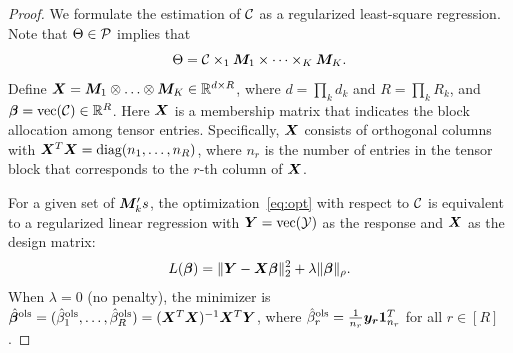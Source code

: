 \documentclass{article}
\begin{document}
\begin{appendices}
\begin{proof}
We formulate the estimation of $\mathcal{C}$ as a regularized least-square regression. Note that $\Theta\in\mathcal{P}$ implies that
\[
\Theta=\mathcal{C}\times_1\bm M_1\times \cdots \times_K \bm M_K.
\]
Define $\bm X=\bm M_1\otimes \ldots \otimes \bm M_K\in \mathbb{R}^{d\times R}$, where $d=\prod_k d_k$ and $R=\prod_k R_k$, and ${\bm \beta}=\text{vec}(\mathcal{C})\in\mathbb{R}^R$. Here $\bm X$ is a membership matrix that indicates the block allocation among tensor entries. Specifically, $\bm X$ consists of orthogonal columns with $\bm X^T\bm X=\text{diag}(n_1,\ldots,n_R)$, where $n_r$ is the number of entries in the tensor block that corresponds to the $r$-th column of $\bm X$.

For a given set of $\bm M_k's$, the optimization~\eqref{eq:opt} with respect to $\mathcal{C}$ is equivalent to a regularized linear regression with $\bm Y=\text{vec}(\mathcal{Y})$ as the response and $\bm X$ as the design matrix:
\begin{equation}\label{eq:opt}
L({\bm \beta})=\lVert\bm Y-\bm X \bm{\beta}\rVert_2^2+\lambda\lVert\bm{\beta}\rVert_\rho.
\end{equation}
When $\lambda=0$ (no penalty), the minimizer is $\hat {\bm \beta}^{\text{ols}}=(\hat \beta^{\text{ols}}_1,\ldots,\hat \beta^{\text{ols}}_R)=(\bm X^T\bm X)^{-1}\bm X^T\bm Y$, where $\hat \beta^{\text{ols}}_r={1\over n_r}\bm{y}_{\bm{r}}\mathbf{1}^T_{n_r}$ for all $r\in[R]$.


\end{proof}
\end{appendices}
\end{document}
